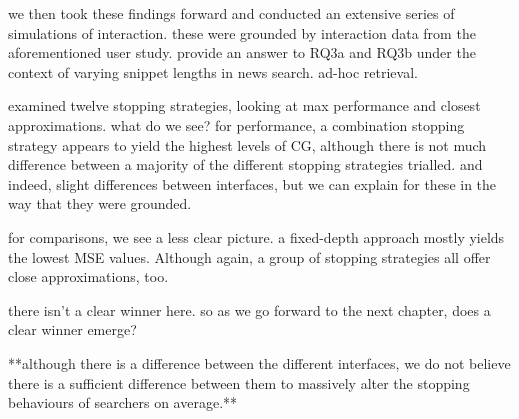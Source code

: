 we then took these findings forward and conducted an extensive series of simulations of interaction.
these were grounded by interaction data from the aforementioned user study.
provide an answer to RQ3a and RQ3b under the context of varying snippet lengths in news search. ad-hoc retrieval.

examined twelve stopping strategies, looking at max performance and closest approximations.
what do we see? for performance, a combination stopping strategy appears to yield the highest levels of CG, although there is not much difference between a majority of the different stopping strategies trialled. and indeed, slight differences between interfaces, but we can explain for these in the way that they were grounded.

for comparisons, we see a less clear picture. a fixed-depth approach mostly yields the lowest MSE values. Although again, a group of stopping strategies all offer close approximations, too.

there isn't a clear winner here. so as we go forward to the next chapter, does a clear winner emerge?

**although there is a difference between the different interfaces, we do not believe there is a sufficient difference between them to massively alter the stopping behaviours of searchers on average.**